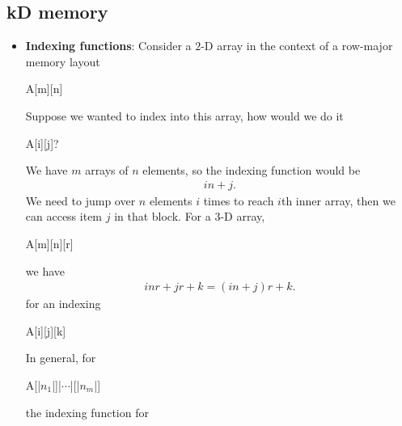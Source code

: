 \documentclass{report}
\begin{document}
        \pagebreak 
        \subsection{kD memory}
        \begin{itemize}
            \item \textbf{Indexing functions}: Consider a $2$-D array in the context of a row-major memory layout
                \bigbreak \noindent 
                \begin{cppcode}
                    A[m][n]
                \end{cppcode}
                \bigbreak \noindent 
                Suppose we wanted to index into this array, how would we do it
                \bigbreak \noindent 
                \begin{cppcode}
                    A[i][j]?
                \end{cppcode}
                \bigbreak \noindent 
                We have $m$ arrays of $n$ elements, so the indexing function would be
                \begin{align*}
                    in + j
                .\end{align*}
                 We need to jump over $n$ elements $i$ times to reach $i$th inner array, then we can access item $j$ in that block.
                 \bigbreak \noindent 
                 For a 3-D array,
                 \bigbreak \noindent 
                 \begin{cppcode}
                     A[m][n][r]
                 \end{cppcode}
                 \bigbreak \noindent 
                 we have
                 \bigbreak \noindent 
                 \begin{align*}
                    inr + jr + k = (in+j)r + k
                 .\end{align*}
                 for an indexing
                 \bigbreak \noindent 
                 \begin{cppcode}
                     A[i][j][k]
                 \end{cppcode}
                 \bigbreak \noindent 
                 In general, for 
                 \bigbreak \noindent 
                 \begin{cppcode}
                     A[|$n_{1}$|]|$\cdots$|[|$n_{m}$|]
                 \end{cppcode}
                 \bigbreak \noindent 
                 the indexing function for 
                 \bigbreak \noindent 

\end{itemize}
\end{document}
